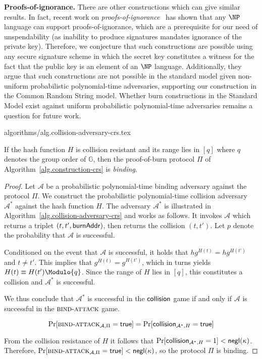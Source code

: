 \noindent\textbf{Proofs-of-ignorance.}
There are other constructions which can give similar results. In fact, recent
work on \emph{proofs-of-ignorance}~\cite{deshpande2018proofs} has shown that any
$\NP$ language can support proofs-of-ignorance, which are a prerequisite for our
need of unspendability (as inability to produce signatures mandates ignorance of
the private key). Therefore, we conjecture that such constructions
are possible using any secure signature scheme in which the secret key
constitutes a witness for the fact that the public key is an element of an $\NP$
language. Additionally, they argue that such constructions are not possible in
the standard model given non-uniform probabilistic polynomial-time adversaries,
supporting our construction in the Common Random String model. Whether burn
constructions in the Standard Model exist against uniform probabilistic
polynomial-time adversaries remains a question for future work.

{algorithms/alg.collision-adversary-crs.tex}

\begin{theorem}[Binding]
  If the hash function $H$ is collision resistant and its range lies in $[q]$ where $q$ denotes the group order of $\mathbb{G}$, then the proof-of-burn protocol $\Pi$ of Algorithm~\ref{alg.construction-crs} is \emph{binding}.
\end{theorem}
\begin{proof}
  Let $\mathcal{A}$ be a probabilistic polynomial-time binding adversary against the protocol $\Pi$. We construct the probabilistic polynomial-time collision adversary $\mathcal{A}^*$ against the hash function $H$. The adversary $\mathcal{A}^*$ is illustrated in Algorithm~\ref{alg.collision-adversary-crs} and works as follows. It invokes $\mathcal{A}$ which returns a triplet $(t, t', \mathsf{burnAddr})$, then returns the collision $(t, t')$. Let $p$ denote the probability that $\mathcal{A}$ is successful.

  Conditioned on the event that $\mathcal{A}$ is successful, it holds that
  $h g^{H(t)} = h g^{H(t')}$ and $t \neq t'$. This implies that $g^{H(t)} = g^{H(t')}$, which in turns yields $H(t) \equiv H(t') \Modulo{q}$. Since the range of $H$ lies in $[q]$, this constitutes a collision and $\mathcal{A}^*$ is successful.

  We thus conclude that $\mathcal{A^*}$ is successful in the $\textsf{collision}$ game if and only if $\mathcal{A}$ is successful in the $\textsc{bind}\-\text{-}\-\textsc{attack}$ game.

  \[
    \Pr[\textsc{bind}\-\text{-}\-\textsc{attack}_{\mathcal{A},\Pi} = \mathsf{true}]
    =
    \Pr[\textsf{collision}_{\mathcal{A}^*,H} = \mathsf{true}]
  \]

  From the collision resistance of $H$ it follows that $\Pr[\textsf{collision}_{\mathcal{A}^*,H} = 1] < \textsf{negl}(\kappa)$. Therefore,
  $\Pr[\textsc{bind}\-\text{-}\-\textsc{attack}_{\mathcal{A},\Pi} = \mathsf{true}] < \textsf{negl}(\kappa)$, so
  the protocol $\Pi$ is binding.
\end{proof}

